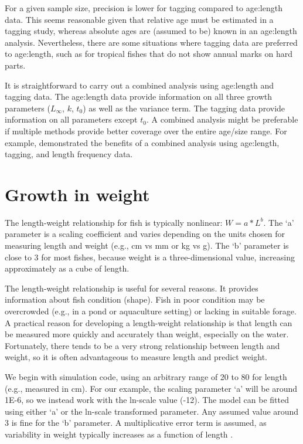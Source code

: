 \documentclass[
]{krantz}
\begin{document}
For a given sample size, precision is lower for tagging compared to age:length data. This seems reasonable given that relative age must be estimated in a tagging study, whereas absolute ages are (assumed to be) known in an age:length analysis. Nevertheless, there are some situations where tagging data are preferred to age:length, such as for tropical fishes that do not show annual marks on hard parts.

It is straightforward to carry out a combined analysis using age:length and tagging data. The age:length data provide information on all three growth parameters (\(L_\infty\), \(k\), \(t_0\)) as well as the variance term. The tagging data provide information on all parameters except \(t_0\). A combined analysis might be preferable if multiple methods provide better coverage over the entire age/size range. For example, \citet{scherrer.etal2021} demonstrated the benefits of a combined analysis using age:length, tagging, and length frequency data.

\hypertarget{LnWgt}{%
\section{Growth in weight}\label{LnWgt}}

The length-weight relationship for fish is typically nonlinear: \(W=a*L^b\). The `a' parameter is a scaling coefficient and varies depending on the units chosen for measuring length and weight (e.g., cm vs mm or kg vs g). The `b' parameter is close to 3 for most fishes, because weight is a three-dimensional value, increasing approximately as a cube of length.

The length-weight relationship is useful for several reasons. It provides information about fish condition (shape). Fish in poor condition may be overcrowded (e.g., in a pond or aquaculture setting) or lacking in suitable forage. A practical reason for developing a length-weight relationship is that length can be measured more quickly and accurately than weight, especially on the water. Fortunately, there tends to be a very strong relationship between length and weight, so it is often advantageous to measure length and predict weight.

We begin with simulation code, using an arbitrary range of 20 to 80 for length (e.g., measured in cm). For our example, the scaling parameter `a' will be around 1E-6, so we instead work with the ln-scale value (-12). The model can be fitted using either `a' or the ln-scale transformed parameter. Any assumed value around 3 is fine for the `b' parameter. A multiplicative error term is assumed, as variability in weight typically increases as a function of length \citep{hayes.brodziack1997}.
\end{document}
